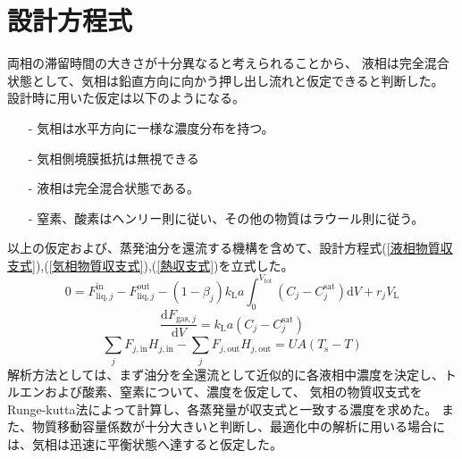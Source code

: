 \documentclass[a4j]{jsreport}
\begin{document}
\section{設計方程式}
両相の滞留時間の大きさが十分異なると考えられることから、
液相は完全混合状態として、気相は鉛直方向に向かう押し出し流れと仮定できると判断した。
設計時に用いた仮定は以下のようになる。
\begin{itemize} 
    \item[-] 気相は水平方向に一様な濃度分布を持つ。
    \item[-] 気相側境膜抵抗は無視できる
    \item[-] 液相は完全混合状態である。
    \item[-] 窒素、酸素はヘンリー則に従い、その他の物質はラウール則に従う。
\end{itemize}
以上の仮定および、蒸発油分を還流する機構を含めて、設計方程式(\ref{液相物質収支式}),(\ref{気相物質収支式}),(\ref{熱収支式})を立式した。\\
\begin{equation}
    \label{液相物質収支式}
    0=F^{\mathrm{ in}}_{\mathrm{ liq},j}-F^{\mathrm{ out}}_{\mathrm{ liq},j} -(1-\beta_j) k_{\mathrm{ L}}a
    \int^{V_{\mathrm{ tot}}}_0(C_j - C^{\mathrm{ sat}}_j)\mathrm{ d}V + r_j V_{\mathrm{ L}}
\end{equation}
\begin{equation}
    \label{気相物質収支式}                                                
    \frac{\mathrm{ d}F_{\mathrm{ gas},j}}{\mathrm{ d}V} = k_{\mathrm{ L}}a(C_j - C^{\mathrm{ sat}}_j)
\end{equation}
\begin{equation}
    \label{熱収支式}
    \sum_jF_{j,\mathrm{in}}H_{j,\mathrm{in}}-\sum_jF_{j,\mathrm{out}}H_{j,\mathrm{out}} = UA(T_\mathrm{s}-T)
\end{equation}
解析方法としては、まず油分を全還流として近似的に各液相中濃度を決定し、トルエンおよび酸素、窒素について、濃度を仮定して、
気相の物質収支式をRunge-kutta法によって計算し、各蒸発量が収支式と一致する濃度を求めた。
また、物質移動容量係数が十分大きいと判断し、最適化中の解析に用いる場合には、気相は迅速に平衡状態へ達すると仮定した。
\end{document}
